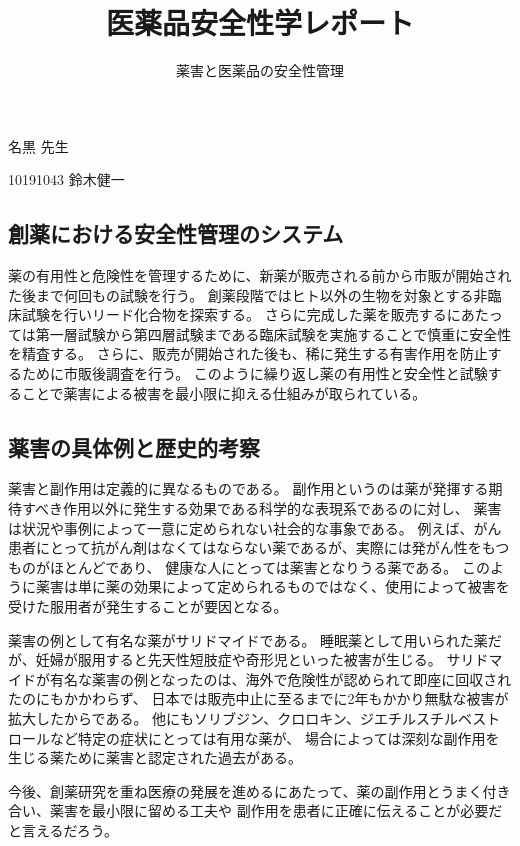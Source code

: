 \documentclass[a4paper,papersize,dvipdfmx]{jsarticle}
\begin{document}
\title{医薬品安全性学レポート}
\author{薬害と医薬品の安全性管理}
\date{}
\maketitle



\begin{flushright}
名黒 先生

10191043 鈴木健一
\end{flushright}

\subsection*{創薬における安全性管理のシステム}
薬の有用性と危険性を管理するために、新薬が販売される前から市販が開始された後まで何回もの試験を行う。
創薬段階ではヒト以外の生物を対象とする非臨床試験を行いリード化合物を探索する。
さらに完成した薬を販売するにあたっては第一層試験から第四層試験まである臨床試験を実施することで慎重に安全性を精査する。
さらに、販売が開始された後も、稀に発生する有害作用を防止するために市販後調査を行う。
このように繰り返し薬の有用性と安全性と試験することで薬害による被害を最小限に抑える仕組みが取られている。

\subsection*{薬害の具体例と歴史的考察}

薬害と副作用は定義的に異なるものである。
副作用というのは薬が発揮する期待すべき作用以外に発生する効果である科学的な表現系であるのに対し、
薬害は状況や事例によって一意に定められない社会的な事象である。
例えば、がん患者にとって抗がん剤はなくてはならない薬であるが、実際には発がん性をもつものがほとんどであり、
健康な人にとっては薬害となりうる薬である。
このように薬害は単に薬の効果によって定められるものではなく、使用によって被害を受けた服用者が発生することが要因となる。

薬害の例として有名な薬がサリドマイドである。
睡眠薬として用いられた薬だが、妊婦が服用すると先天性短肢症や奇形児といった被害が生じる。
サリドマイドが有名な薬害の例となったのは、海外で危険性が認められて即座に回収されたのにもかかわらず、
日本では販売中止に至るまでに2年もかかり無駄な被害が拡大したからである。
他にもソリブジン、クロロキン、ジエチルスチルベストロールなど特定の症状にとっては有用な薬が、
場合によっては深刻な副作用を生じる薬ために薬害と認定された過去がある。


今後、創薬研究を重ね医療の発展を進めるにあたって、薬の副作用とうまく付き合い、薬害を最小限に留める工夫や
副作用を患者に正確に伝えることが必要だと言えるだろう。
\end{document}
